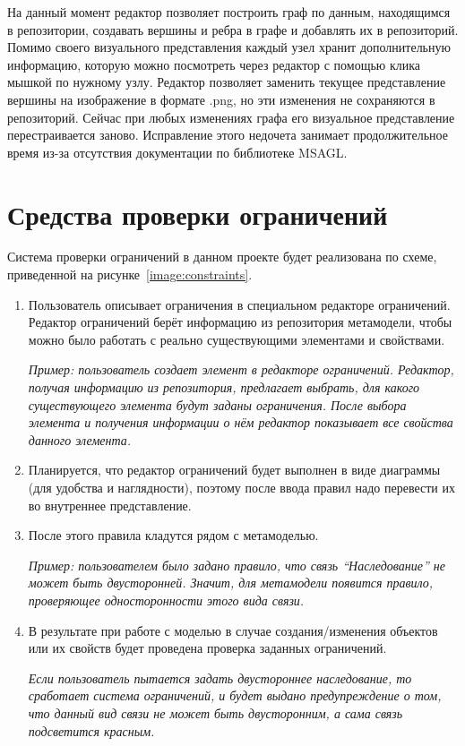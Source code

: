 \documentclass{spisok-article}
\begin{document}
На данный момент редактор позволяет построить граф по данным, находящимся в репозитории, создавать вершины и ребра в графе и добавлять их в репозиторий. Помимо своего визуального представления каждый узел хранит дополнительную информацию, которую можно посмотреть через редактор с помощью клика мышкой по нужному узлу. Редактор позволяет заменить текущее представление вершины на изображение в формате .png, но эти изменения не сохраняются в репозиторий. Сейчас при любых изменениях графа его визуальное представление перестраивается заново. Исправление этого недочета занимает продолжительное время из-за отсутствия документации по библиотеке MSAGL.

\section{Средства проверки ограничений}

Система проверки ограничений в данном проекте будет реализована по схеме, приведенной на рисунке~\ref{image:constraints}.


\begin{enumerate}
	\item Пользователь описывает ограничения в специальном редакторе ограничений. Редактор ограничений берёт информацию из  репозитория метамодели, чтобы можно было работать с реально существующими элементами и свойствами.

		\textit{Пример: пользователь создает элемент в редакторе ограничений. Редактор, получая информацию из репозитория, предлагает выбрать, для какого существующего элемента будут заданы ограничения. После выбора элемента и получения информации о нём редактор показывает все свойства данного элемента.}
	
	\item Планируется, что редактор ограничений будет выполнен в виде диаграммы (для удобства и наглядности), поэтому после ввода правил надо перевести их во внутреннее представление.

	\item После этого правила кладутся рядом с метамоделью.

		\textit{Пример: пользователем было задано правило, что связь ``Наследование'' не может быть двусторонней. Значит, для метамодели появится правило, проверяющее односторонности этого вида связи.}

	\item В результате при работе с моделью в случае создания/изменения объектов или их свойств будет проведена проверка заданных ограничений.

		\textit{Если пользователь пытается задать двустороннее наследование, то сработает система ограничений, и будет выдано предупреждение о том, что данный вид связи не может быть двусторонним, а сама связь подсветится красным.}
\end{enumerate}
\end{document}
